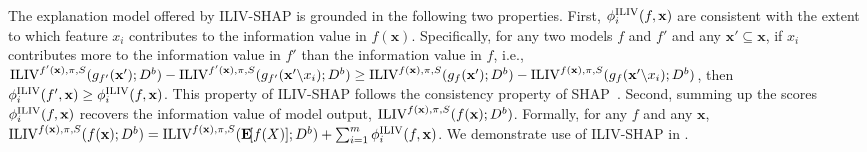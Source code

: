 The explanation model offered by ILIV-SHAP is grounded in the following two properties.
First, $\phi^{\operatorname{ILIV}}_i(f, \mathbf{x})$ are consistent with the extent to which feature $x_i$ contributes to the information value in $f(\mathbf{x})$.
Specifically, for any two models $f$ and $f'$ and any $\mathbf{x}' \subseteq \mathbf{x}$, if $x_i$ contributes more to the information value in $f'$ than the information value in $f$, i.e., $\operatorname{ILIV}^{f'(\mathbf{x}), \pi, S}(g_{f'}(\mathbf{x}'); D^b) - \operatorname{ILIV}^{f'(\mathbf{x}), \pi, S}(g_{f'}(\mathbf{x}' \backslash x_i); D^b) \geq \operatorname{ILIV}^{f(\mathbf{x}), \pi, S}(g_{f}(\mathbf{x}');D^b) - \operatorname{ILIV}^{f(\mathbf{x}), \pi, S}(g_{f}(\mathbf{x}' \backslash x_i); D^b)$, then $\phi^{\operatorname{ILIV}}_i(f', \mathbf{x}) \geq \phi^{\operatorname{ILIV}}_i(f, \mathbf{x})$.
This property of ILIV-SHAP follows the consistency property of SHAP~\citep{lundberg2017unified}.
Second, summing up the scores $\phi^{\operatorname{ILIV}}_i(f, \mathbf{x})$ recovers the information value of model output, $\operatorname{ILIV}^{f(\mathbf{x}), \pi, S}(f(\mathbf{x}); D^b)$.
Formally, for any $f$ and any $\mathbf{x}$, $\ILIV^{f(\mathbf{x}), \dgp, \score}(f(\mathbf{x}); \actionvar^b) = \ILIV^{f(\mathbf{x}), \dgp, \score}(\expect{f(X)}; \actionvar^b) + \sum_{i = 1}^m \phi^{\ILIV}_i(f, \mathbf{x})$.
We demonstrate use of ILIV-SHAP in .






